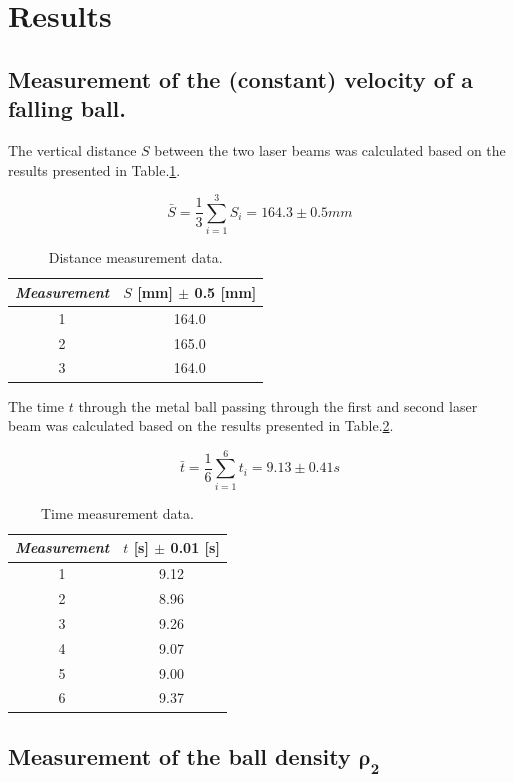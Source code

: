 \documentclass{article}
\begin{document}
\section{Results}

\subsection{Measurement of the (constant) velocity of a falling ball.}
\indent

The vertical distance $S$ between the two laser beams was calculated based on the results presented in Table.\ref{distance}.

$$\bar{S}=\frac{1}{3}\sum_{i=1}^3S_i=164.3\pm0.5mm$$

\begin{table}[!h]
\begin{center}
\begin{tabular}{cc}
\hline
\textit{Measurement} & $S$ [mm] $\pm$ 0.5 [mm] \\
\hline
1	&	164.0\\
2	&	165.0\\
3	&	164.0\\
\hline
\end{tabular}
\caption{Distance measurement data.}\label{distance}
\end{center}
\end{table}

The time $t$ through the metal ball passing through the first and second laser beam was calculated based on the results presented in Table.\ref{time}.

$$\bar{t}=\frac{1}{6}\sum_{i=1}^6t_i=9.13\pm0.41s$$

\begin{table}[!h]
\begin{center}
\begin{tabular}{cc}
\hline
\textit{Measurement} & $t$ [s] $\pm$ 0.01 [s] \\
\hline
1	&	9.12\\
2	&	8.96\\
3	&	9.26\\
4	&	9.07\\
5	&	9.00\\
6	&	9.37\\
\hline
\end{tabular}
\caption{Time measurement data.}\label{time}
\end{center}
\end{table}

\subsection{Measurement of the ball density $\bm{\rho_2}$}
\end{document}
